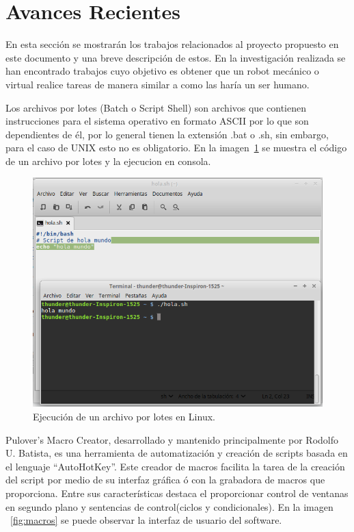 
\section{Avances Recientes}
En esta sección se mostrarán los trabajos relacionados al proyecto propuesto
 en este documento y una breve descripción de estos. En la investigación
 realizada se han encontrado trabajos cuyo objetivo es obtener que un robot
 mecánico o virtual realice tareas de manera similar a como las haría un
 ser humano. 


Los archivos por lotes (Batch o Script Shell) \cite{Silberschatz1999} son
 archivos que contienen instrucciones para el sistema operativo en formato
 ASCII por lo que son dependientes de él, por lo general tienen la extensión
 .bat o .sh, sin embargo, para el caso de UNIX esto no es obligatorio. En la
 imagen~\ref{fig:script} se muestra el código de un archivo por lotes y la 
 ejecucion en consola.


\begin{figure}[H]
\centering
\includegraphics[width=0.7\columnwidth]{CapituloI/Imagenes/Script.png}
\caption{Ejecución de un archivo por lotes en Linux.}
\label{fig:script}
\end{figure}


Pulover's Macro Creator\cite{Batista}, desarrollado y mantenido
 principalmente por Rodolfo U. Batista, es una herramienta de automatización
 y creación de scripts basada en el lenguaje ``AutoHotKey''. Este creador de
 macros facilita la tarea de la creación del script por medio de su interfaz
 gráfica ó con la grabadora de macros que proporciona. Entre sus
 características destaca el proporcionar control de ventanas en segundo plano
 y sentencias de control(ciclos y condicionales). En la imagen
 ~\ref{fig:macros} se puede observar la interfaz de usuario del software.


